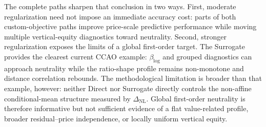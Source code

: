 \documentclass[10pt]{article}
\theoremstyle{definition}
\newcommand{\1}{\mathbf{1}}
\newcommand{\oldtext}[1]{\textcolor{blue}{\sout{#1}}}
\newcommand{\newtext}[1]{\textcolor{impGreen}{#1}}
\begin{document}
The complete paths sharpen that conclusion in two ways. First, moderate
regularization need not impose an immediate accuracy cost: parts of both
custom-objective paths improve price-scale predictive performance while moving
multiple vertical-equity diagnostics toward neutrality. 
\newtext{Second, stronger regularization exposes the limits of a global first-order target. The Surrogate provides the clearest current CCAO example: $\beta_{\log}$ and grouped diagnostics can approach neutrality while the ratio-shape profile remains non-monotone and distance correlation rebounds. The methodological limitation is broader than that example, however: neither Direct nor Surrogate directly controls the non-affine conditional-mean structure measured by $\Delta_{\mathrm{NL}}$. Global first-order neutrality is therefore informative but not sufficient evidence of a flat value-related profile, broader residual--price independence, or locally uniform vertical equity.}
\end{document}
